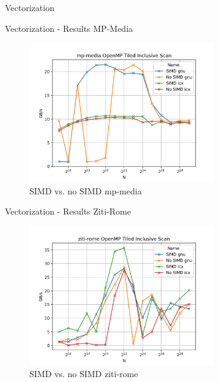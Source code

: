 \begin{frame}{Vectorization}
\end{frame} 

\begin{frame}{Vectorization - Results MP-Media}
	\begin{figure}
		\includegraphics[width=80mm]{graphs/mp-media OpenMP Tiled Inclusive Scan.png}
		\caption{{SIMD vs. no SIMD mp-media}}
	\end{figure}
\end{frame}

\begin{frame}{Vectorization - Results Ziti-Rome}
	\begin{figure}
		\includegraphics[width=80mm]{graphs/ziti-rome OpenMP Tiled Inclusive Scan.png}
		\caption{{SIMD vs. no SIMD ziti-rome}}
	\end{figure}
\end{frame}
